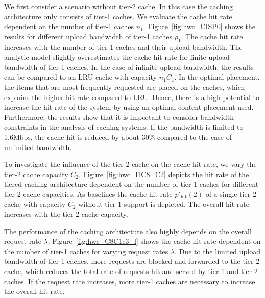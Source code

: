 We first consider a scenario without tier-2 cache.
In this case the caching architecture only consists of tier-1 caches.
We evaluate the cache hit rate dependent on the number of tier-1 caches $n_1$.
Figure~\ref{fig:hwc_CISP0} shows the results for different upload bandwidth of tier-1 caches $\rho_1$.
The cache hit rate increases with the number of tier-1 caches and their upload bandwidth.
The analytic model slightly overestimates the cache hit rate for finite upload bandwidth of tier-1 caches.
In the case of infinite upload bandwidth, the results can be compared to an LRU cache with capacity $n_1 C_1$.
In the optimal placement, the items that are most frequently requested are placed on the caches, which explains the higher hit rate compared to LRU.
Hence, there is a high potential to increase the hit rate of the system by using an optimal content placement used.
Furthermore, the results show that it is important to consider bandwidth constraints in the analysis of caching systems.
If the bandwidth is limited to 1.6Mbps, the cache hit is reduced by about 30\% compared to the case of unlimited bandwidth.



To investigate the influence of the tier-2 cache on the cache hit rate, we vary the tier-2 cache capacity $C_2$.
Figure~\ref{fig:hwc_l1C8_C2} depicts the hit rate of the tiered caching architecture dependent on the number of tier-1 caches for different tier-2 cache capacities.
As baselines the cache hit rate $p'_\text{hit}(2)$ of a single tier-2 cache with capacity $C_2$ without tier-1 support is depicted.
The overall hit rate increases with the tier-2 cache capacity.

The performance of the caching architecture also highly depends on the overall request rate $\lambda$.
Figure~\ref{fig:hwc_C8C1e3_l} shows the cache hit rate dependent on the number of tier-1 caches for varying request rates $\lambda$.
Due to the limited upload bandwidth of tier-1 caches, more requests are blocked and forwarded to the tier-2 cache, which reduces the total rate of requests hit and served by tier-1 and tier-2 caches.
If the request rate increases, more tier-1 caches are necessary to increase the overall hit rate.

